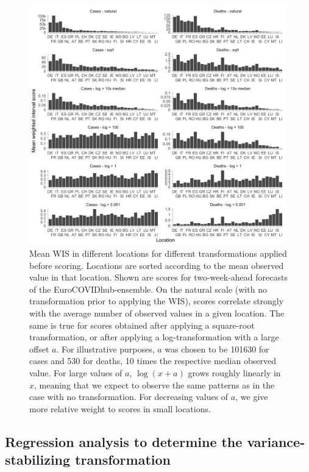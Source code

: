\documentclass{article}
\begin{document}
\begin{figure}[h!]
    \centering
    \includegraphics[width=0.99\textwidth]{output/figures/HUB-scores-locations-log-variants.png}
    \caption{Mean WIS in different locations for different transformations applied before scoring. Locations are sorted according to the mean observed value in that location. Shown are scores for two-week-ahead forecasts of the EuroCOVIDhub-ensemble. On the natural scale (with no transformation prior to applying the WIS), scores correlate strongly with the average number of observed values in a given location. The same is true for scores obtained after applying a square-root transformation, or after applying a log-transformation with a large offset $a$. For illustrative purposes, $a$ was chosen to be 101630 for cases and 530 for deaths, 10 times the respective median observed value. For large values of $a$, $\log(x + a)$ grows roughly linearly in $x$, meaning that we expect to observe the same patterns as in the case with no transformation. For decreasing values of $a$, we give more relative weight to scores in small locations.}
    \label{fig:HUB-log-different-offsets}
\end{figure}


\subsection{Regression analysis to determine the variance-stabilizing transformation}
\label{sec:HUB-regression}
\end{document}
